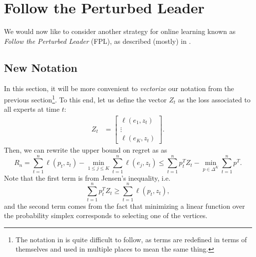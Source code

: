 
\section{Follow the Perturbed Leader}

We would now like to consider another strategy for online learning known as \emph{Follow the Perturbed Leader} (FPL), as described (mostly) in \cite[Lecture~16]{rigollet}.

\subsection{New Notation}
In this section, it will be more convenient to \emph{vectorize} our notation from the previous section\footnote{The notation in \cite[Lecture~16]{rigollet} is quite difficult to follow, as terms are redefined in terms of themselves and used in multiple places to mean the same thing.}. To this end, let us define the vector $Z_t$ as the loss associated to all experts at time $t$:
\begin{align*}
  Z_t &= \begin{bmatrix}
         \ell(e_1, z_t) \\
         \vdots \\
         \ell(e_K, z_t)
       \end{bmatrix}.
\end{align*}
Then, we can rewrite the upper bound on regret as  as
\begin{equation} \label{eqn:regret_bound}
R_n = \sum_{t=1}^n \ell(p_t, z_t) - \min_{1 \leq j \leq K} \sum_{t=1}^n \ell(e_j, z_t) \leq \sum_{t=1}^n p_t^T Z_t - \min_{p \in \Delta^K} \sum_{t=1}^n p^T.
\end{equation}
Note that the first term is from Jensen's inequality, i.e.
\[
\sum_{t=1}^n p_t^T Z_t \geq \sum_{t=1}^n \ell(p_t, z_t),
\]
and the second term comes from the fact that minimizing a linear function over the probability simplex corresponds to selecting one of the vertices.

